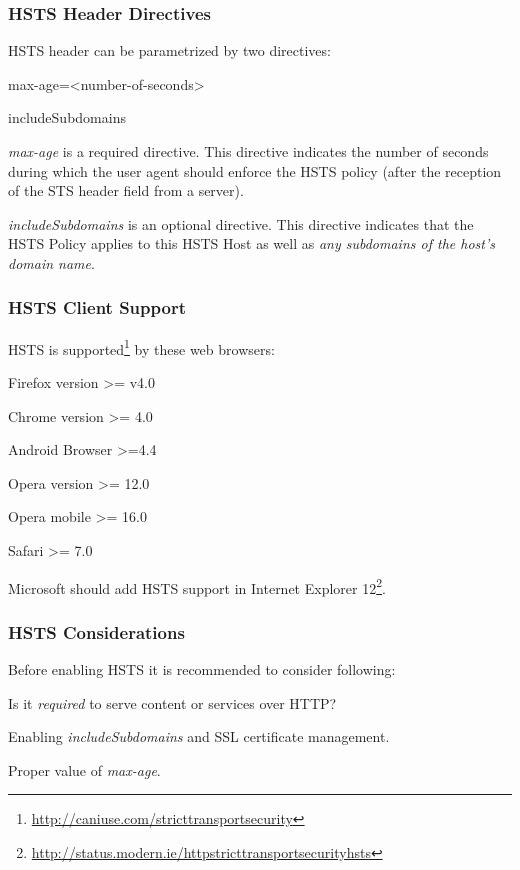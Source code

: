 \subsubsection{HSTS Header Directives}
\label{subsubsection:HSTS Header Directives}
HSTS header can be parametrized by two directives:
\begin{itemize*}
  \item max-age=<number-of-seconds> 
	\item includeSubdomains 
\end{itemize*}

\emph{max-age} is a required directive. This directive indicates the number of seconds during which the user agent should enforce the HSTS policy (after the reception of the STS header field from a server).

\emph{includeSubdomains} is an optional directive. This directive indicates that the HSTS Policy applies to this HSTS Host as well as \emph{any subdomains of the host's domain name}.

\subsubsection{HSTS Client Support}
\label{subsubsection:HSTS Client Support}
HSTS is supported\footnote{\url{http://caniuse.com/stricttransportsecurity}} by these web browsers:
\begin{itemize*}
  \item Firefox version >= v4.0
	\item Chrome version >= 4.0
	\item Android Browser >=4.4
	\item Opera version >= 12.0 
	\item Opera mobile >= 16.0
	\item Safari >= 7.0
\end{itemize*}
Microsoft should add HSTS support in Internet Explorer 12\footnote{\url{http://status.modern.ie/httpstricttransportsecurityhsts}}.

\subsubsection{HSTS Considerations}
\label{subsubsection:HSTS Considerations}
Before enabling HSTS it is recommended to consider following:
\begin{itemize*}
  \item Is it \emph{required} to serve content or services over HTTP?
	\item Enabling \emph{includeSubdomains} and SSL certificate management.
	\item Proper value of \emph{max-age}. 
\end{itemize*}


